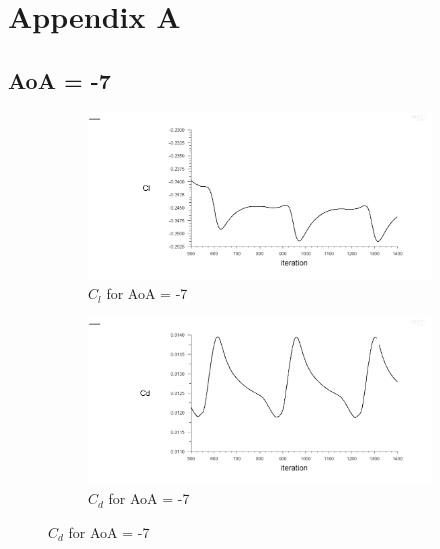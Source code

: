 \section*{Appendix A}

\subsection*{AoA = -7}


\begin{figure}[!htbp]
  \begin{subfigure}[b]{0.45\textwidth}
    \includegraphics[width=\textwidth]{-7_deg/AoA_-7_cl.png}
    \caption{$C_l$ for AoA = -7}
    \label{fig:aoa_-7_cl}
  \end{subfigure}
  \hfill
  \begin{subfigure}[b]{0.45\textwidth}
    \includegraphics[width=\textwidth]{-7_deg/AoA_-7_cd.png}
    \caption{$C_d$ for AoA = -7}
    \label{fig:aoa_-7_cd}
  \end{subfigure}
\end{figure}